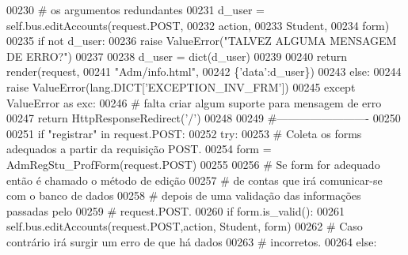 \begin{DoxyCode}
{}
00230                         \textcolor{comment}{# os argumentos redundantes
}
00231                         d\_user = self.bus.editAccounts(request.POST,
00232                                                         action,
00233                                                         Student,
00234                                                         form)
00235                         \textcolor{keywordflow}{if} \textcolor{keywordflow}{not} d\_user:
00236                             \textcolor{keywordflow}{raise} ValueError(\textcolor{stringliteral}{"TALVEZ ALGUMA MENSAGEM DE ERRO?"})
00237 
00238                         d\_user = dict(d\_user)
00239 
00240                         \textcolor{keywordflow}{return} render(request, 
00241                                       \textcolor{stringliteral}{"Adm/info.html"}, 
00242                                       \{\textcolor{stringliteral}{'data'}:d\_user\})
00243                     \textcolor{keywordflow}{else}:
00244                         \textcolor{keywordflow}{raise} ValueError(lang.DICT[\textcolor{stringliteral}{'EXCEPTION\_INV\_FRM'}])
00245                 \textcolor{keywordflow}{except} ValueError \textcolor{keyword}{as} exc:
00246                     \textcolor{comment}{# falta criar algum suporte para mensagem de erro
}
00247                     \textcolor{keywordflow}{return} HttpResponseRedirect(\textcolor{stringliteral}{'/'})
00248 
00249             \textcolor{comment}{#-------------------------
}
00250 
00251             \textcolor{keywordflow}{if} \textcolor{stringliteral}{"registrar"} \textcolor{keywordflow}{in} request.POST:
00252                 \textcolor{keywordflow}{try}:
00253                     \textcolor{comment}{# Coleta os forms adequados a partir da requisição POST.
}
00254                     form = AdmRegStu\_ProfForm(request.POST)
00255 
00256                     \textcolor{comment}{# Se form for adequado então é chamado o método de edição 
}
00257                     \textcolor{comment}{#   de contas que irá comunicar-se com o banco de dados 
}
00258                     \textcolor{comment}{#   depois de uma validação das informações passadas pelo
}
00259                     \textcolor{comment}{#   request.POST.
}
00260                     \textcolor{keywordflow}{if} form.is\_valid():
00261                         self.bus.editAccounts(request.POST,action, Student, form)
00262                     \textcolor{comment}{# Caso contrário irá surgir um erro de que há dados
}
00263                     \textcolor{comment}{#   incorretos.
}
00264                     \textcolor{keywordflow}{else}:

\end{DoxyCode}
